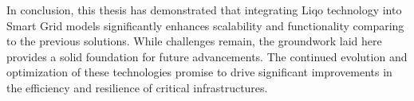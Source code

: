 In conclusion, this thesis has demonstrated that integrating Liqo technology into Smart Grid models significantly enhances scalability and functionality comparing to the previous solutions. While challenges remain, the groundwork laid here provides a solid foundation for future advancements. The continued evolution and optimization of these technologies promise to drive significant improvements in the efficiency and resilience of critical infrastructures.




